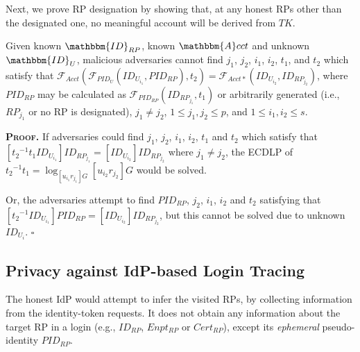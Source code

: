 Next,
we prove RP designation by showing that,
    at any honest RPs other than the designated one, no meaningful account will be derived from $TK$.


\begin{thm}[RP Designation]
Given known $\mathbbm{ID}_{RP}$, known $\mathbbm{A}cct$ and unknown $\mathbbm{ID}_U$,
 malicious adversaries cannot find ${j_1}$, ${j_2}$, ${i_1}$, ${i_2}$, $t_1$, and $t_2$ which satisfy that $\mathcal{F}_{Acct}(\mathcal{F}_{PID_U}(ID_{U_{i_1}}, PID_{RP}), t_2) = \mathcal{F}_{Acct\ast}(ID_{U_{i_2}}, ID_{RP_{j_2}})$,
where $PID_{RP}$ may be calculated as $\mathcal{F}_{PID_{RP}}(ID_{RP_{j_1}}, t_1)$
    or arbitrarily generated (i.e., $RP_{j_1}$ or no RP is designated),
    ${j_1} \neq {j_2}$, $1 \leq j_1, j_2 \leq p$, and $1 \leq i_1, i_2 \leq s$.
\label{thm-rp-designation}
\end{thm}

\noindent\textbf{\textsc{Proof.}} 
If adversaries could find ${j_1}$, ${j_2}$, ${i_1}$, ${i_2}$, $t_1$ and $t_2$ which satisfy that $[{t_2}^{-1}t_1ID_{U_{i_1}}]ID_{RP_{j_1}} = [ID_{U_{i_2}}]ID_{RP_{j_2}}$
 where ${j_1} \neq {j_2}$,
 the ECDLP of ${t_2}^{-1}t_1 = \log_{[{u_{i_1}}{r_{j_1}}]G}{[{u_{i_2}}{r_{j_2}}]G}$ would be solved.

Or, the adversaries attempt to find $PID_{RP}$, ${j_2}$, ${i_1}$, ${i_2}$ and $t_2$ satisfying that  $[{{t_2}^{-1}}ID_{U_{i_1}}]PID_{RP} = [ID_{U_{i_2}}]ID_{RP_{j_2}}$,
        but this cannot be solved due to unknown $ID_{U_{i}}$.
\hfill $\square$

\subsection{Privacy against IdP-based Login Tracing}
\label{subsec:IdP-privacy}

The honest IdP would attempt to infer the visited RPs,
by collecting information from the identity-token requests.
It does not obtain any information about the target RP in a login (e.g., $ID_{RP}$, $Enpt_{RP}$ or $Cert_{RP}$), except its \emph{ephemeral} pseudo-identity $PID_{RP}$.

